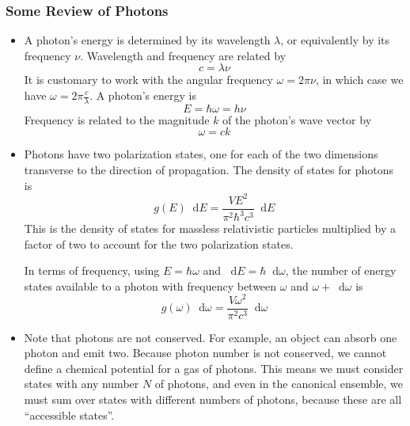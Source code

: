 \documentclass[11pt, a4paper]{article}
\newcommand{\diff}{\mathop{}\!\mathrm{d}} %
\begin{document}
\subsubsection{Some Review of Photons}
\begin{itemize}
	\item A photon's energy is determined by its wavelength $ \lambda $, or equivalently by its frequency $ \nu $. Wavelength and frequency are related by
	\begin{equation*}
		c = \lambda \nu
	\end{equation*}
	It is customary to work with the angular frequency $ \omega = 2\pi \nu $, in which case we have $ \omega = 2\pi \frac{c}{\lambda} $. A photon's energy is
	\begin{equation*}
		E = \hbar \omega = h \nu
	\end{equation*}
	Frequency is related to the magnitude $ k $ of the photon's wave vector by 
	\begin{equation*}
		\omega = ck
	\end{equation*}
	
	\item Photons have two polarization states, one for each of the two dimensions transverse to the direction of propagation. The density of states for photons is
	\begin{equation*}
		g(E)\diff E = \frac{VE^{2}}{\pi^{2}\hbar^{3}c^{3}} \diff E
	\end{equation*}
	This is the density of states for massless relativistic particles multiplied by a factor of two to account for the two polarization states.
	
	In terms of frequency, using $ E = \hbar \omega $ and $ \diff E = \hbar \diff \omega $, the number of energy states available to a photon with frequency between $ \omega  $ and $ \omega + \diff \omega $ is 
	\begin{equation*}
		g(\omega) \diff \omega = \frac{V \omega^{2}}{\pi^{2}c^{3}}\diff \omega
	\end{equation*}
	
	\item Note that photons are not conserved. For example, an object can absorb one photon and emit two. Because photon number is not conserved, we cannot define a chemical potential for a gas of photons. This means we must consider states with any number $ N $ of photons, and even in the canonical ensemble, we must sum over states with different numbers of photons, because these are all ``accessible states''. 

\end{itemize}
\end{document}
